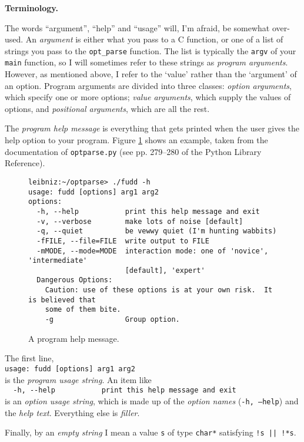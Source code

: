 \documentclass{article}
\newenvironment{chunk}[1]
{\par\smallskip\noindent\textbf{#1.}\par\nopagebreak}
{\par\smallskip}
\renewcommand{\tt}{\texttt}
\begin{document}
\begin{chunk}{Terminology}
  The words ``argument'', ``help'' and ``usage'' will, I'm afraid, be
  somewhat over-used. An \emph{argument} is either what you pass to a
  C function, or one of a list of strings you pass to the
  \tt{opt\_parse} function. The list is typically the \tt{argv} of
  your \tt{main} function, so I will sometimes refer to these
  strings as \emph{program arguments}. However, as mentioned above, I
  refer to the `value' rather than the `argument' of an
  option. Program arguments are divided into three classes:
  \emph{option arguments}, which specify one or more options;
  \emph{value arguments}, which supply the values of options, and
  \emph{positional arguments}, which are all the rest.

  The \emph{program help message} is everything that gets printed when
  the user gives the help option to your program. Figure
  \ref{fig:fudd-help} shows an example, taken from the documentation
  of \tt{optparse.py} (see pp. 279--280 of the Python Library Reference).
  \begin{figure}\small
\begin{verbatim}
leibniz:~/optparse> ./fudd -h
usage: fudd [options] arg1 arg2
options:
  -h, --help           print this help message and exit
  -v, --verbose        make lots of noise [default]
  -q, --quiet          be vewwy quiet (I'm hunting wabbits)
  -fFILE, --file=FILE  write output to FILE
  -mMODE, --mode=MODE  interaction mode: one of 'novice', 'intermediate'
                       [default], 'expert'
  Dangerous Options:
    Caution: use of these options is at your own risk.  It is believed that
    some of them bite.
    -g                 Group option.
\end{verbatim}
    \caption{A program help message.}\label{fig:fudd-help}
  \end{figure}
The first line, \\
\verb+usage: fudd [options] arg1 arg2+\\
is the \emph{program usage string}. An item like \\
\verb+  -h, --help           print this help message and exit+\\
is an \emph{option usage string}, which is made up of the \emph{option
  names} (\tt{-h, --help}) and the \emph{help text}. Everything else
is \emph{filler}.

  Finally, by an \emph{empty string} I mean a value \tt{s} of type
  \tt{char*} satisfying \tt{!s || !*s}. 
\end{chunk}
\end{document}
